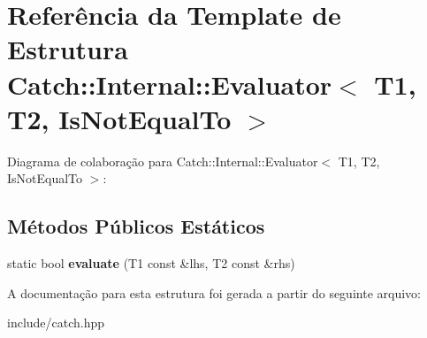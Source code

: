 \hypertarget{structCatch_1_1Internal_1_1Evaluator_3_01T1_00_01T2_00_01IsNotEqualTo_01_4}{}\section{Referência da Template de Estrutura Catch\+:\+:Internal\+:\+:Evaluator$<$ T1, T2, Is\+Not\+Equal\+To $>$}
\label{structCatch_1_1Internal_1_1Evaluator_3_01T1_00_01T2_00_01IsNotEqualTo_01_4}


Diagrama de colaboração para Catch\+:\+:Internal\+:\+:Evaluator$<$ T1, T2, Is\+Not\+Equal\+To $>$\+:
\subsection*{Métodos Públicos Estáticos}
\begin{DoxyCompactItemize}
\item 
static bool {\bfseries evaluate} (T1 const \&lhs, T2 const \&rhs)\hypertarget{structCatch_1_1Internal_1_1Evaluator_3_01T1_00_01T2_00_01IsNotEqualTo_01_4_a956a12d0f4a7dceb5a1ce914421ff945}{}\label{structCatch_1_1Internal_1_1Evaluator_3_01T1_00_01T2_00_01IsNotEqualTo_01_4_a956a12d0f4a7dceb5a1ce914421ff945}

\end{DoxyCompactItemize}


A documentação para esta estrutura foi gerada a partir do seguinte arquivo\+:\begin{DoxyCompactItemize}
\item 
include/catch.\+hpp\end{DoxyCompactItemize}
